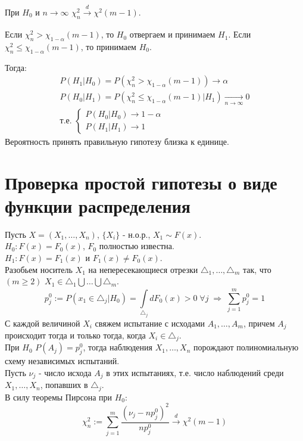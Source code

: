\begin{theorem}\label{lec:7/the:1}
	При $H_0$ и $n \to \infty$ $\chi_n^2 \xrightarrow[]{d} \chi^2 (m-1)$.
\end{theorem}

\begin{rulee}\label{lec:7/rule:1}
	Если $\chi_n^2 > \chi_{1-\alpha}(m-1)$, то $H_0$ отвергаем и принимаем $H_1$. Если $\chi_n^2 \le \chi_{1-\alpha}(m-1)$, то принимаем $H_0$.

	Тогда:
	$$\begin{gathered}
		P(H_1 | H_0) = P(\chi_n^2 > \chi_{1-\alpha} (m-1)) \to \alpha \\
		P(H_0 | H_1) = P(\chi_n^2 \le \chi_{1-\alpha} (m-1) | H_1) \xrightarrow[n\to \infty]{}0 \\
		\text{т.е. } \begin{cases}
			P(H_0 | H_0) \to 1 - \alpha \\
			P(H_1 | H_1) \to 1
		\end{cases}
	\end{gathered}$$
	Вероятность принять правильную гипотезу близка к единице.
\end{rulee}


\section{Проверка простой гипотезы о виде функции распределения}\label{lec:7/sec:2}

Пусть $X = (X_1, \dots, X_n)$, $\{X_i\}$ - н.о.р., $X_1 \sim F(x)$.\\
$H_0: F(x) = F_0 (x)$, $F_0$ полностью известна.\\
$H_1: F(x) = F_1 (x)$ и $F_1 (x) \not = F_0 (x)$.\\

Разобьем носитель $X_1$ на непересекающиеся отрезки $\triangle_1, \dots, \triangle_m$ так, что \\
$(m \ge 2)$ $X_1 \in \triangle_1 \bigcup \dots \bigcup \triangle_m$.
$$p_j^0 := P(x_1 \in \triangle_j | H_0) = \underset{\triangle_j}{\overset{}{\int}}d F_0 (x) > 0 \; \forall j \; \Rightarrow \; \underset{j=1}{\overset{m}{\sum}}p_j^0 = 1$$
С каждой величиной $X_i$ свяжем испытание с исходами $A_1, \dots, A_m$, причем $A_j$ происходит тогда и только тогда, когда $X_i \in \triangle_j$.\\
При $H_0$ $P(A_j) = p_j^0$, тогда наблюдения $X_1, \dots, X_n$ порождают полиномиальную схему независимых испытаний. \\
Пусть $\nu_j$ - число исхода $A_j$ в этих испытаниях, т.е. число наблюдений среди $X_1, \dots, X_n$, попавших в $\triangle_j$.\\
В силу теоремы Пирсона при $H_0$:
$$\chi_n^2 := \underset{j=1}{\overset{m}{\sum}}\frac{(\nu_j - n p_j^0)^2}{n p_j^0} \xrightarrow[]{d}\chi^2 (m-1)$$


